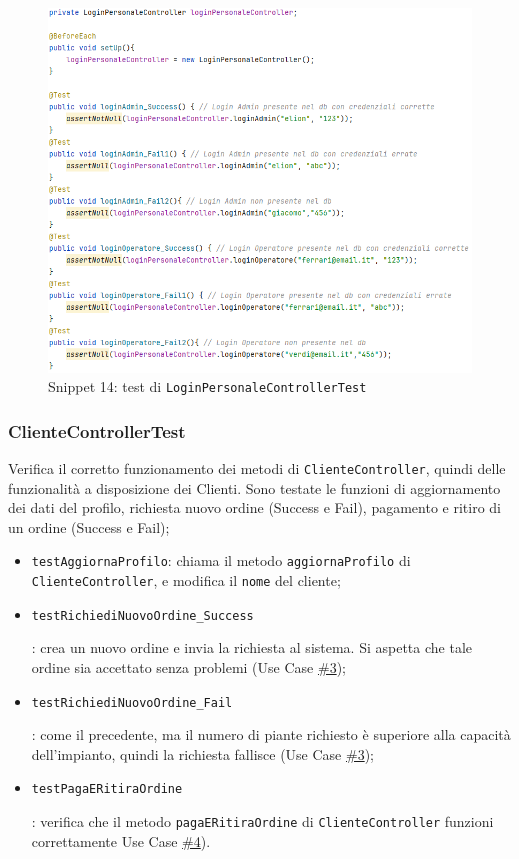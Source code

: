 \documentclass{article}
\newcommand{\code}[1]{\texttt{#1}}
\begin{document}
\begin{figure}[H]
    \centering
    \includegraphics[scale=0.5]{resources/images/Snippets/snippet_LoginPersonaleControllerTest.png}
    \captionsetup{labelformat=empty,labelsep=none}
    \caption{Snippet 14: test di \code{LoginPersonaleControllerTest}}
    \label{fig:snippet_LoginPersonaleControllerTest}
\end{figure}

\subsubsection{ClienteControllerTest}
Verifica il corretto funzionamento dei metodi di \code{ClienteController}, quindi delle funzionalità a disposizione dei Clienti. Sono testate le funzioni di aggiornamento dei dati del profilo, richiesta nuovo ordine (Success e Fail), pagamento e ritiro di un ordine (Success e Fail);
\begin{itemize}
    \item \code{testAggiornaProfilo}: chiama il metodo \code{aggiornaProfilo} di \code{ClienteController}, e modifica il \code{nome} del cliente;
    \item \hypertarget{testRichiediNuovoOrdine\_Success}{\code{testRichiediNuovoOrdine\_Success}}: crea un nuovo ordine e invia la richiesta al sistema. Si aspetta che tale ordine sia accettato senza problemi (Use Case \hyperref[use_case_3]{\#3});
    \item \hypertarget{testRichiediNuovoOrdine\_Fail}{\code{testRichiediNuovoOrdine\_Fail}}: come il precedente, ma il numero di piante richiesto è superiore alla capacità dell'impianto, quindi la richiesta fallisce (Use Case \hyperref[use_case_3]{\#3});
    \item \hypertarget{testPagaERitiraOrdine}{\code{testPagaERitiraOrdine}}: verifica che il metodo \code{pagaERitiraOrdine} di \code{ClienteController} funzioni correttamente Use Case \hyperref[use_case_4]{\#4}).
\end{itemize}
\end{document}
